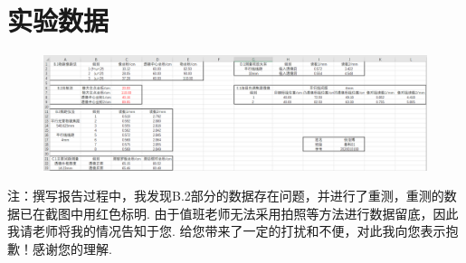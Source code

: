 \documentclass[UTF8]{ctexart}
\begin{document}
\vspace{3em}
\section{实验数据}
\begin{figure}[H]\begin{center}
    \includegraphics[scale=0.4]{data.PNG}
\end{center}\end{figure}
\vspace{2em}
\small{注：撰写报告过程中，我发现B.2部分的数据存在问题，并进行了重测，重测的数据已在截图中用红色标明. 由于值班老师无法采用拍照等方法进行数据留底，因此我请老师将我的情况告知于您. 给您带来了一定的打扰和不便，对此我向您表示抱歉！感谢您的理解.}
\end{document}
